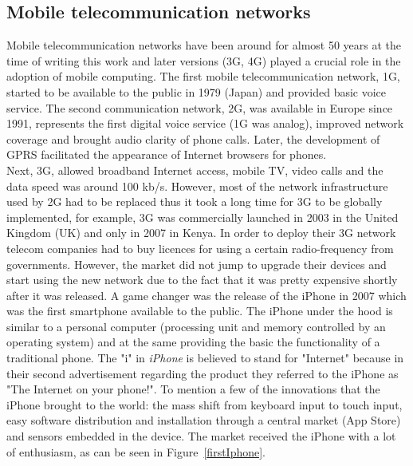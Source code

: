 \documentclass[11]{article}
\begin{document}
\subsection{Mobile telecommunication networks}
	Mobile telecommunication networks have been around for almost 50 years at the time of writing this work and later versions (3G, 4G) played a crucial role in the adoption of mobile computing. The first mobile telecommunication network, 1G,  started to be available to the public in 1979 (Japan) and provided basic voice service. The second communication network, 2G, was available in Europe since 1991,  represents the first digital voice service (1G was analog), improved network coverage and brought audio clarity of phone calls. Later, the development of GPRS facilitated the appearance of Internet browsers for phones. \\
	\indent
	Next, 3G, allowed broadband Internet access, mobile TV, video calls and the data speed was around 100 kb/s. However, most of the network infrastructure used by 2G  had to be replaced thus it took a long time for 3G to be globally implemented, for example, 3G was commercially launched in 2003 in the United Kingdom (UK) and only in 2007 in Kenya. In order to deploy their 3G network telecom companies had to buy licences for using a certain radio-frequency from governments. However, the market did not jump to upgrade their devices and start using the new network due to the fact that it was pretty expensive shortly after it was released. A game changer was the release of the iPhone in 2007 which was the first smartphone available to the public. The iPhone under the hood is similar to a personal computer (processing unit and memory controlled by an operating system) and at the same providing the basic the functionality of a traditional phone. The "i" in \textit{iPhone} is believed to stand for "Internet" because in their second advertisement regarding the product they referred to the iPhone as "The Internet on your phone!". To mention a few of the innovations that the iPhone brought to the world: the mass shift from keyboard input to touch input, easy software distribution and installation through a central market (App Store) and sensors embedded in the device. The market received the iPhone with a lot of enthusiasm, as can be seen in Figure~\ref{firstIphone}.\\
\end{document}
